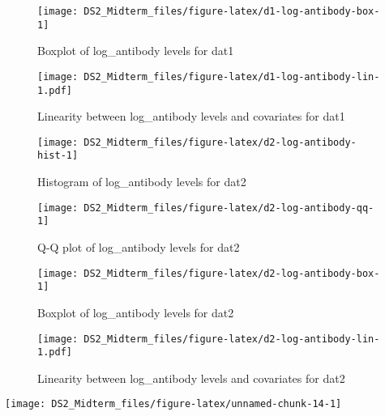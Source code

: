 \documentclass[
]{article}
\begin{document}
\begin{figure}

{\centering \texttt{[image: DS2\_Midterm\_files/figure-latex/d1-log-antibody-box-1]} 

}

\caption{Boxplot of log\_antibody levels for dat1}\label{fig:d1-log-antibody-box}
\end{figure}

\begin{figure}
\centering
\texttt{[image: DS2\_Midterm\_files/figure-latex/d1-log-antibody-lin-1.pdf]}
\caption{Linearity between log\_antibody levels and covariates for dat1}
\end{figure}

\begin{figure}

{\centering \texttt{[image: DS2\_Midterm\_files/figure-latex/d2-log-antibody-hist-1]} 

}

\caption{Histogram of log\_antibody levels for dat2}\label{fig:d2-log-antibody-hist}
\end{figure}

\begin{figure}

{\centering \texttt{[image: DS2\_Midterm\_files/figure-latex/d2-log-antibody-qq-1]} 

}

\caption{Q-Q plot of log\_antibody levels for dat2}\label{fig:d2-log-antibody-qq}
\end{figure}

\begin{figure}

{\centering \texttt{[image: DS2\_Midterm\_files/figure-latex/d2-log-antibody-box-1]} 

}

\caption{Boxplot of log\_antibody levels for dat2}\label{fig:d2-log-antibody-box}
\end{figure}

\begin{figure}
\centering
\texttt{[image: DS2\_Midterm\_files/figure-latex/d2-log-antibody-lin-1.pdf]}
\caption{Linearity between log\_antibody levels and covariates for dat2}
\end{figure}

\begin{center}\texttt{[image: DS2\_Midterm\_files/figure-latex/unnamed-chunk-14-1]} \end{center}
\end{document}
